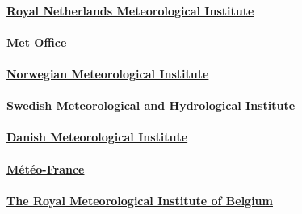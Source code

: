 \hypertarget{royal-netherlands-meteorological-institute}{%
\paragraph{\texorpdfstring{\href{https://data.knmi.nl/datasets}{Royal
Netherlands Meteorological
Institute}}{Royal Netherlands Meteorological Institute}}\label{royal-netherlands-meteorological-institute}}

\hypertarget{met-office}{%
\paragraph{\texorpdfstring{\href{https://www.metoffice.gov.uk/datapoint}{Met
Office}}{Met Office}}\label{met-office}}

\hypertarget{norwegian-meteorological-institute}{%
\paragraph{\texorpdfstring{\href{https://www.met.no/en/free-meteorological-data}{Norwegian
Meteorological
Institute}}{Norwegian Meteorological Institute}}\label{norwegian-meteorological-institute}}

\hypertarget{swedish-meteorological-and-hydrological-institute}{%
\paragraph{\texorpdfstring{\href{https://www.smhi.se/en/services/professional-services/data-and-statistics}{Swedish
Meteorological and Hydrological
Institute}}{Swedish Meteorological and Hydrological Institute}}\label{swedish-meteorological-and-hydrological-institute}}

\hypertarget{danish-meteorological-institute}{%
\paragraph{\texorpdfstring{\href{http://research.dmi.dk/data/}{Danish
Meteorological
Institute}}{Danish Meteorological Institute}}\label{danish-meteorological-institute}}

\hypertarget{muxe9tuxe9o-france}{%
\paragraph{\texorpdfstring{\href{https://donneespubliques.meteofrance.fr/}{Météo-France}}{Météo-France}}\label{muxe9tuxe9o-france}}

\hypertarget{the-royal-meteorological-institute-of-belgium}{%
\paragraph{\texorpdfstring{\href{https://opendata.meteo.be/}{The Royal
Meteorological Institute of
Belgium}}{The Royal Meteorological Institute of Belgium}}\label{the-royal-meteorological-institute-of-belgium}}

